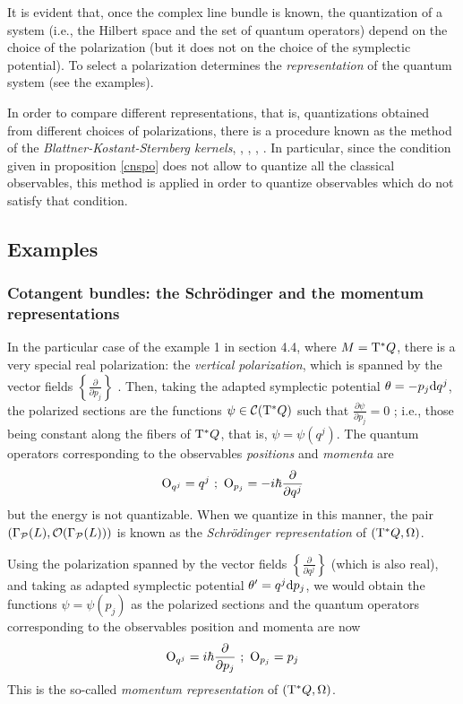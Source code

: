 \documentclass[12pt]{article}
\theoremstyle{plain}
\def\dst{\(}
\def\derpar#1#2{\frac{\partial{#1}}{\partial{#2}}}
\def\d{{\rm d}}
\def\C{{\cal C}}
\def\P{{\cal P}}
\def\Op{{\rm O}}
\def\Tan{{\rm T}}
\begin{document}
It is evident that, once the complex line bundle is known,
the quantization of a system
(i.e., the Hilbert space and the set of quantum operators)
depend on the choice of the polarization
(but it does not on the choice of the symplectic potential).
To select a polarization determines the
{\it representation} of the quantum system
(see the examples).

In order to compare different representations, that is,
quantizations obtained from different choices of polarizations,
there is a procedure known as the method of the {\it
Blattner-Kostant-Sternberg kernels},
\cite{Bl-73}, \cite{Bl-75}, \cite{Bl-77}, \cite{GS-77}.
In particular, since the condition given in proposition
\ref{cnspo} does not allow to quantize all the classical observables,
this method is applied in order to quantize observables
which do not satisfy that condition.




\subsection{Examples}


\subsubsection{Cotangent bundles: the Schr\"odinger and
the momentum representations}


In the particular case of the example 1 in section 4.4,
where  $M = \Tan^* Q$,
there is a very special real polarization:
the {\it vertical polarization},
which is spanned by the vector fields
\dst\left\{ \derpar{}{p_j} \right\}\) .
Then, taking the adapted symplectic potential
$\theta = -p_j \d q^j$,
the polarized sections are the functions
$\psi \in \C (\Tan^*Q)$
such that \dst\derpar{\psi}{p_j} = 0\) ;
i.e., those being constant along the fibers of $\Tan^*Q$,
that is, $\psi = \psi (q^j)$.
The quantum operators corresponding to the observables
{\it positions} and {\it momenta} are
$$
\Op_{q^j} = q^j \  ; \
\Op_{p_j} = -i\hbar \derpar{}{q^j}
$$
but the energy is not quantizable.
When we quantize in this manner, the pair
$(\Gamma_\P (L),{\cal O}(\Gamma_\P (L)))$
is known as the {\it Schr\"{o}dinger representation}
of $(\Tan^*Q,\Omega )$.

Using the polarization spanned by the vector fields
\dst\left\{ \derpar{}{q^j} \right\}\)
(which is also real), and taking as adapted symplectic potential
$\theta ' = q^j \d p_j$,
we would obtain the functions
$\psi = \psi (p_j)$ as the polarized sections and
the quantum operators corresponding to the observables
position and momenta are now
$$
\Op_{q^j} = i\hbar \derpar{}{p_j}
\ ; \ \Op_{p_j} = p_j
$$
This is the so-called
{\it momentum representation} of $(\Tan^*Q,\Omega )$.
\end{document}
